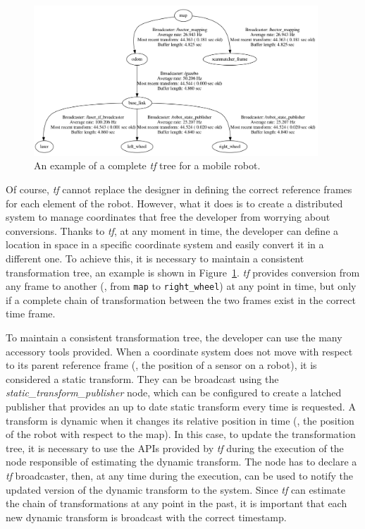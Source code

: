 \begin{figure}[t]
    \centering
    \includegraphics[width=0.95\textwidth]{gfx/ros/tf_tree}
    \caption{An example of a complete \textit{tf} tree for a mobile robot.}\label{fig:ros-tf-tree}
\end{figure}

Of course, \textit{tf} cannot replace the designer in defining the correct reference frames for each element of the robot. However, what it does is to create a distributed system to manage coordinates that free the developer from worrying about conversions. Thanks to \textit{tf}, at any moment in time, the developer can define a location in space in a specific coordinate system and easily convert it in a different one. To achieve this, it is necessary to maintain a consistent transformation tree, an example is shown in Figure~\ref{fig:ros-tf-tree}. \textit{tf} provides conversion from any frame to another (\eg, from \texttt{map} to \texttt{right\_wheel}) at any point in time, but only if a complete chain of transformation between the two frames exist in the correct time frame.

To maintain a consistent transformation tree, the developer can use the many accessory tools provided. When a coordinate system does not move with respect to its parent reference frame (\eg, the position of a sensor on a robot), it is considered a static transform. They can be broadcast using the \textit{static\_transform\_publisher} node, which can be configured to create a latched publisher that provides an up to date static transform every time is requested. A transform is dynamic when it changes its relative position in time (\eg, the position of the robot with respect to the map). In this case, to update the transformation tree, it is necessary to use the APIs provided by \textit{tf} during the execution of the node responsible of estimating the dynamic transform. The node has to declare a \textit{tf} broadcaster, then, at any time during the execution, can be used to notify the updated version of the dynamic transform to the system.  Since \textit{tf} can estimate the chain of transformations at any point in the past, it is important that each new dynamic transform is broadcast with the correct timestamp.

